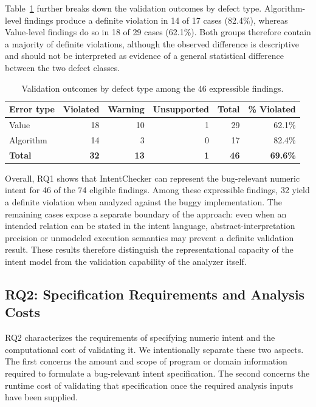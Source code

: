 \documentclass[pdflatex,sn-basic]{sn-jnl}%
\theoremstyle{thmstyleone}%
\theoremstyle{thmstyletwo}%
\theoremstyle{thmstylethree}%
\begin{document}
Table~\ref{tab:rq1-validation-by-type} further breaks down the validation outcomes by
defect type. Algorithm-level findings produce a definite violation in 14 of 17 cases
(82.4\%), whereas Value-level findings do so in 18 of 29 cases (62.1\%).
Both groups therefore contain a majority of definite violations, although the
observed difference is descriptive and should not be interpreted as evidence of a
general statistical difference between the two defect classes.

\begin{table}[t]
\centering
\caption{Validation outcomes by defect type among the 46 expressible findings.}
\label{tab:rq1-validation-by-type}
\small
\begin{tabular}{lrrrrr}
\toprule
\textbf{Error type} &
\textbf{Violated} &
\textbf{Warning} &
\textbf{Unsupported} &
\textbf{Total} &
\textbf{\% Violated} \\
\midrule
Value     & 18 & 10 & 1 & 29 & 62.1\% \\
Algorithm & 14 &  3 & 0 & 17 & 82.4\% \\
\midrule
\textbf{Total} & \textbf{32} & \textbf{13} & \textbf{1} &
\textbf{46} & \textbf{69.6\%} \\
\bottomrule
\end{tabular}
\end{table}

Overall, RQ1 shows that IntentChecker can represent the bug-relevant numeric intent
for 46 of the 74 eligible findings. Among these expressible findings, 32 yield a
definite violation when analyzed against the buggy implementation. The remaining
cases expose a separate boundary of the approach: even when an intended relation can
be stated in the intent language, abstract-interpretation precision or unmodeled
execution semantics may prevent a definite validation result. These results therefore
distinguish the representational capacity of the intent model from the validation
capability of the analyzer itself.

\subsection{RQ2: Specification Requirements and Analysis Costs}\label{sec:rq2}

RQ2 characterizes the requirements of specifying numeric intent and the computational
cost of validating it. We intentionally separate these two aspects. The first concerns
the amount and scope of program or domain information required to formulate a
bug-relevant intent specification. The second concerns the runtime cost of validating
that specification once the required analysis inputs have been supplied.
\end{document}
